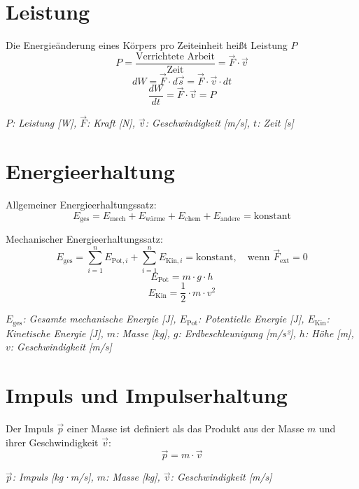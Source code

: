 \documentclass[a5paper,10pt]{article}
\newenvironment{displayformula}
{
	\begin{framed}
		\color{formulaColor}
	}
	{\end{framed}}
\newcommand{\formulalegend}[1]{%
	\par\vspace{0.5ex}%
	{{\color{legendColor}\RaggedRight\small\textit{#1}}}%
	\par\vspace{1.5ex}%
}
\begin{document}
\section{Leistung}

\begin{displayformula}
	Die Energieänderung eines Körpers pro Zeiteinheit heißt Leistung \( P \)
	\[
	P = \frac{\text{Verrichtete Arbeit}}{\text{Zeit}} = \vec{F} \cdot \vec{v}
	\]
	\[
	dW = \vec{F} \cdot d \vec{s} = \vec{F} \cdot \vec{v} \cdot dt
	\]
	\[
	\frac{dW}{dt} = \vec{F} \cdot \vec{v} = P
	\]
\end{displayformula}
\formulalegend{
	\( P \): Leistung [W], \( \vec{F} \): Kraft [N], \( \vec{v} \): Geschwindigkeit [m/s], \( t \): Zeit [s]
}
\newpage
\section{Energieerhaltung}

\begin{displayformula}
	Allgemeiner Energieerhaltungssatz: 
	\[
	E_{\text{ges}} = E_{\text{mech}} + E_{\text{wärme}} + E_{\text{chem}} + E_{\text{andere}} = \text{konstant}
	\]
\end{displayformula}

\begin{displayformula}
	Mechanischer Energieerhaltungssatz:
	\[
	E_{\text{ges}} = \sum_{i=1}^{n} E_{\text{Pot}, i} + \sum_{i=1}^{n} E_{\text{Kin}, i} = \text{konstant}, \quad \text{wenn } \vec{F}_{\text{ext}} = 0
	\]
	\[
	E_{\text{Pot}} = m \cdot g \cdot h
	\]
	\[
	E_{\text{Kin}} = \frac{1}{2} \cdot m \cdot v^2
	\]
\end{displayformula}
\formulalegend{
	\( E_{\text{ges}} \): Gesamte mechanische Energie [J], \( E_{\text{Pot}} \): Potentielle Energie [J], \( E_{\text{Kin}} \): Kinetische Energie [J], \( m \): Masse [kg], \( g \): Erdbeschleunigung [m/s²], \( h \): Höhe [m], \( v \): Geschwindigkeit [m/s]
}
\newpage
\section{Impuls und Impulserhaltung}

\begin{displayformula}
	Der Impuls \( \vec{p} \) einer Masse ist definiert als das Produkt aus der Masse \( m \) und ihrer Geschwindigkeit \( \vec{v} \):
	\[
	\vec{p} = m \cdot \vec{v}
	\]
\end{displayformula}
\formulalegend{
	\( \vec{p} \): Impuls [kg·m/s], \( m \): Masse [kg], \( \vec{v} \): Geschwindigkeit [m/s]
}
\end{document}
